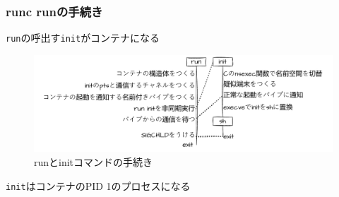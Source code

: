 \documentclass[unicode, 14pt, aspectratio=169]{beamer}
\begin{document}
\begin{frame}[t]
  \frametitle{runc runの手続き}
  \large
  \texttt{run}の呼出す\texttt{init}がコンテナになる
  \normalsize
  \begin{figure}
    \centering
    \includegraphics[width=13cm]{images/overview.drawio.pdf}
    \caption{runとinitコマンドの手続き} %
  \end{figure}
  \texttt{init}はコンテナのPID 1のプロセスになる
\end{frame}
\end{document}
